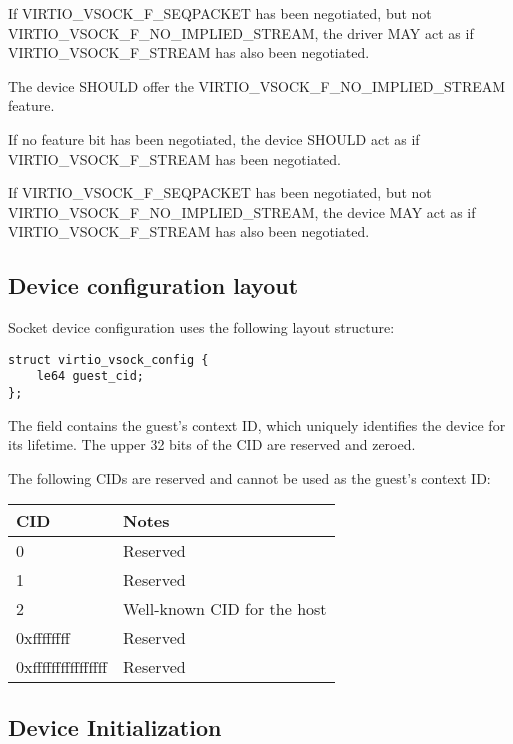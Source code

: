 If VIRTIO_VSOCK_F_SEQPACKET has been negotiated, but not
VIRTIO_VSOCK_F_NO_IMPLIED_STREAM, the driver MAY act as if
VIRTIO_VSOCK_F_STREAM has also been negotiated.


The device SHOULD offer the VIRTIO_VSOCK_F_NO_IMPLIED_STREAM feature.

If no feature bit has been negotiated, the device SHOULD act as if
VIRTIO_VSOCK_F_STREAM has been negotiated.

If VIRTIO_VSOCK_F_SEQPACKET has been negotiated, but not
VIRTIO_VSOCK_F_NO_IMPLIED_STREAM, the device MAY act as if
VIRTIO_VSOCK_F_STREAM has also been negotiated.

\subsection{Device configuration layout}\label{sec:Device Types / Socket Device / Device configuration layout}

Socket device configuration uses the following layout structure:

\begin{lstlisting}
struct virtio_vsock_config {
	le64 guest_cid;
};
\end{lstlisting}

The  field contains the guest's context ID, which uniquely
identifies the device for its lifetime.  The upper 32 bits of the CID are
reserved and zeroed.

The following CIDs are reserved and cannot be used as the guest's context ID:

\begin{tabular}{|l|l|}
\hline
CID    & Notes \\
\hline \hline
0                 & Reserved \\
\hline
1                 & Reserved \\
\hline
2                 & Well-known CID for the host \\
\hline
0xffffffff        & Reserved \\
\hline
0xffffffffffffffff        & Reserved \\
\hline
\end{tabular}

\subsection{Device Initialization}\label{sec:Device Types / Socket Device / Device Initialization}

